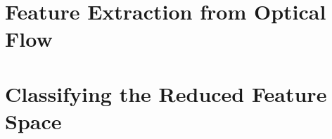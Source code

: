 \section{\label{section:feature_extraction}Feature Extraction from Optical Flow}
\section{\label{section:classification}Classifying the Reduced Feature Space}
